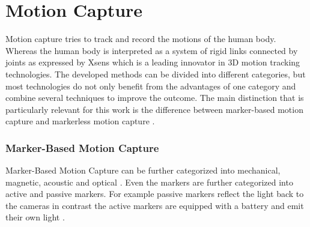 \section{Motion Capture}
Motion capture tries to track and record the motions of the human body. Whereas the human body is interpreted as a system of rigid links connected by joints as expressed by Xsens \cite{xsens} which is a leading innovator in 3D motion tracking technologies. The developed methods can be divided into different categories, but most technologies do not only benefit from the advantages of one category and combine several techniques to improve the outcome. The main distinction that is particularly relevant for this work is the difference between marker-based motion capture and markerless motion capture \cite{Nogueira2012MotionCF}.

\subsubsection{Marker-Based Motion Capture}
Marker-Based Motion Capture can be further categorized into mechanical, magnetic, acoustic and optical \cite{xsens}. Even the markers are further categorized into active and passive markers. For example passive markers reflect the light back to the cameras in contrast the active markers are equipped with a battery and emit their own light \cite{Nogueira2012MotionCF}.

